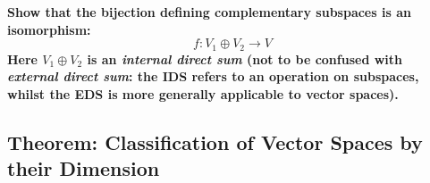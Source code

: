 \documentclass{exam}
\begin{document}
\begin{questions}

\question \textbf{Show that the bijection defining complementary subspaces is an isomorphism:
\[
f : V_1 \oplus V_2 \to V
\]
Here $V_1 \oplus V_2$ is an \textit{internal direct sum} (not to be confused with \textit{external direct sum}: the IDS refers to an operation on subspaces, whilst the EDS is more generally applicable to vector spaces).}

\end{questions}

\subsection{Theorem: Classification of Vector Spaces by their Dimension}
\label{t177}
\end{document}
